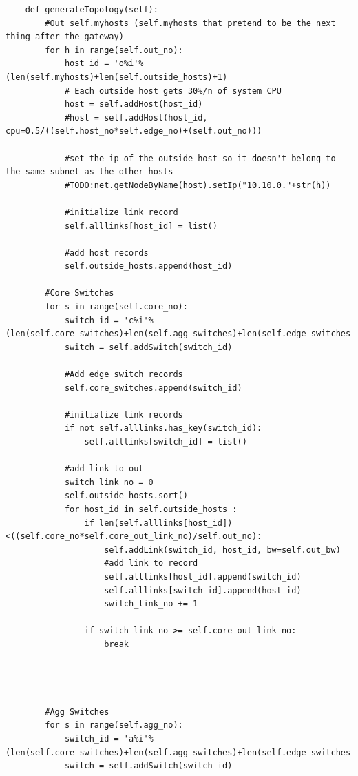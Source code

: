 \documentclass[12pt,english,oneside]{book}
\begin{document}
\begin{lstlisting}
    def generateTopology(self):
        #Out self.myhosts (self.myhosts that pretend to be the next thing after the gateway)
        for h in range(self.out_no):
            host_id = 'o%i'% (len(self.myhosts)+len(self.outside_hosts)+1)
            # Each outside host gets 30%/n of system CPU
            host = self.addHost(host_id)
            #host = self.addHost(host_id, cpu=0.5/((self.host_no*self.edge_no)+(self.out_no)))
            
            #set the ip of the outside host so it doesn't belong to the same subnet as the other hosts
            #TODO:net.getNodeByName(host).setIp("10.10.0."+str(h))

            #initialize link record
            self.alllinks[host_id] = list()
            
            #add host records
            self.outside_hosts.append(host_id)
                
        #Core Switches
        for s in range(self.core_no):
            switch_id = 'c%i'%(len(self.core_switches)+len(self.agg_switches)+len(self.edge_switches)+1)
            switch = self.addSwitch(switch_id)
            
            #Add edge switch records
            self.core_switches.append(switch_id)
            
            #initialize link records
            if not self.alllinks.has_key(switch_id):
                self.alllinks[switch_id] = list()
            
            #add link to out
            switch_link_no = 0
            self.outside_hosts.sort()
            for host_id in self.outside_hosts :
                if len(self.alllinks[host_id])<((self.core_no*self.core_out_link_no)/self.out_no):
                    self.addLink(switch_id, host_id, bw=self.out_bw)
                    #add link to record
                    self.alllinks[host_id].append(switch_id)
                    self.alllinks[switch_id].append(host_id)
                    switch_link_no += 1
                    
                if switch_link_no >= self.core_out_link_no:
                    break
            
            
             
            
        #Agg Switches
        for s in range(self.agg_no):
            switch_id = 'a%i'%(len(self.core_switches)+len(self.agg_switches)+len(self.edge_switches)+1)
            switch = self.addSwitch(switch_id)
            

\end{lstlisting}
\end{document}

